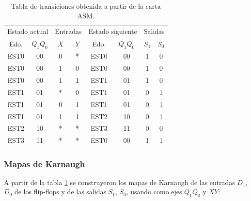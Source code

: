 \begin{table}[H]
  \centering
  \begin{tabular}{cc|cc|cc|cc}
    \toprule
    \multicolumn{2}{c|}{Estado actual} & \multicolumn{2}{c|}{Entradas} &
    \multicolumn{2}{c|}{Estado siguiente} & \multicolumn{2}{c}{Salidas} \\
    Edo. & $Q_1Q_0$ & $X$ & $Y$ & Edo. & $Q_1Q_0$ & $S_1$ & $S_0$ \\
    \midrule
    EST0 & 00 & 0 & * & EST0 & 00 & 1 & 0 \\
    EST0 & 00 & 1 & 0 & EST0 & 00 & 1 & 0 \\
    EST0 & 00 & 1 & 1 & EST1 & 01 & 1 & 0 \\
    EST1 & 01 & * & 0 & EST1 & 01 & 0 & 1 \\
    EST1 & 01 & 0 & 1 & EST1 & 01 & 0 & 1 \\
    EST1 & 01 & 1 & 1 & EST2 & 10 & 0 & 1 \\
    EST2 & 10 & * & * & EST3 & 11 & 0 & 0 \\
    EST3 & 11 & * & * & EST0 & 00 & 1 & 1 \\
    \bottomrule
  \end{tabular}
  \caption{Tabla de transiciones obtenida a partir de la carta ASM.}
  \label{tab:transiciones}
\end{table}

\subsubsection{Mapas de Karnaugh}

A partir de la tabla \ref{tab:transiciones} se construyeron los mapas de Karnaugh de las
entradas $D_1$, $D_0$ de los flip-flops y de las salidas $S_1$, $S_0$, usando como ejes
$Q_1Q_0$ y $XY$:


